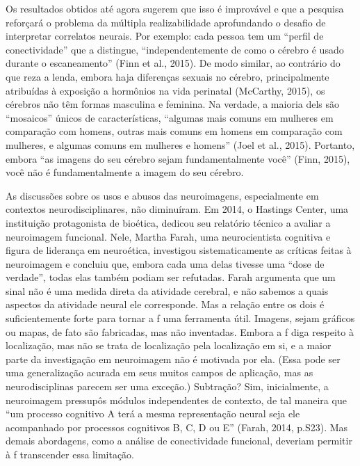 Os resultados obtidos até agora sugerem que isso é improvável e que a
pesquisa reforçará o problema da múltipla realizabilidade aprofundando o
desafio de interpretar correlatos neurais. Por exemplo: cada pessoa tem
um ``perfil de conectividade'' que a distingue, ``independentemente de
como o cérebro é usado durante o escaneamento'' (Finn et al., 2015). De
modo similar, ao contrário do que reza a lenda, embora haja diferenças
sexuais no cérebro, principalmente atribuídas à exposição a hormônios na
vida perinatal (McCarthy, 2015), os cérebros não têm formas masculina e
feminina. Na verdade, a maioria dels são ``mosaicos'' únicos de
características, ``algumas mais comuns em mulheres em comparação com
homens, outras mais comuns em homens em comparação com mulheres, e
algumas comuns em mulheres e homens'' (Joel et al., 2015). Portanto,
embora ``as imagens do seu cérebro sejam fundamentalmente você'' (Finn,
2015), você não é fundamentalmente a imagem do seu cérebro.

As discussões sobre os usos e abusos das neuroimagens, especialmente em
contextos neurodisciplinares, não diminuíram. Em 2014, o Hastings
Center, uma instituição protagonista de bioética, dedicou seu relatório
técnico a avaliar a neuroimagem funcional. Nele, Martha Farah, uma
neurocientista cognitiva e figura de liderança em neuroética, investigou
sistematicamente as críticas feitas à neuroimagem e concluiu que, embora
cada uma delas tivesse uma ``dose de verdade'', todas elas também podiam
ser refutadas. Farah argumenta que um sinal  não é uma medida direta
da atividade cerebral, e não sabemos a quais aspectos da atividade
neural ele corresponde. Mas a relação entre os dois é suficientemente
forte para tornar a f uma ferramenta útil. Imagens, sejam gráficos ou
mapas, de fato são fabricadas, mas não inventadas. Embora a f diga
respeito à localização, mas não se trata de localização pela localização
em si, e a maior parte da investigação em neuroimagem não é motivada por
ela. (Essa pode ser uma generalização acurada em seus muitos campos de
aplicação, mas as neurodisciplinas parecem ser uma exceção.) Subtração?
Sim, inicialmente, a neuroimagem pressupôs módulos independentes de
contexto, de tal maneira que ``um processo cognitivo A terá a mesma
representação neural seja ele acompanhado por processos cognitivos B, C,
D ou E'' (Farah, 2014, p.S23). Mas demais abordagens, como a análise de
conectividade funcional, deveriam permitir à f transcender essa
limitação.

